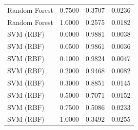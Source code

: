 \begin{tabular}{lrrr}
Random Forest & 0.7500 & 0.3707 & 0.0236 \\
Random Forest & 1.0000 & 0.2575 & 0.0182 \\
SVM (RBF) & 0.0000 & 0.9881 & 0.0038 \\
SVM (RBF) & 0.0500 & 0.9861 & 0.0036 \\
SVM (RBF) & 0.1000 & 0.9824 & 0.0047 \\
SVM (RBF) & 0.2000 & 0.9468 & 0.0082 \\
SVM (RBF) & 0.3000 & 0.8851 & 0.0145 \\
SVM (RBF) & 0.5000 & 0.7071 & 0.0152 \\
SVM (RBF) & 0.7500 & 0.5086 & 0.0233 \\
SVM (RBF) & 1.0000 & 0.3492 & 0.0255 \\
\bottomrule
\end{tabular}
